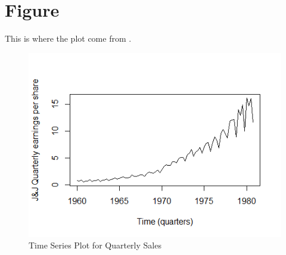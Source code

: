 \documentclass[a4paper,12pt]{article}
\begin{document}
\section{Figure}
This is where the plot come from \cite{zhang2003time}.



\begin{figure}
    \centering
    \includegraphics{tplt1.png}
    \caption{Time Series Plot for Quarterly Sales}
\end{figure}
\end{document}
